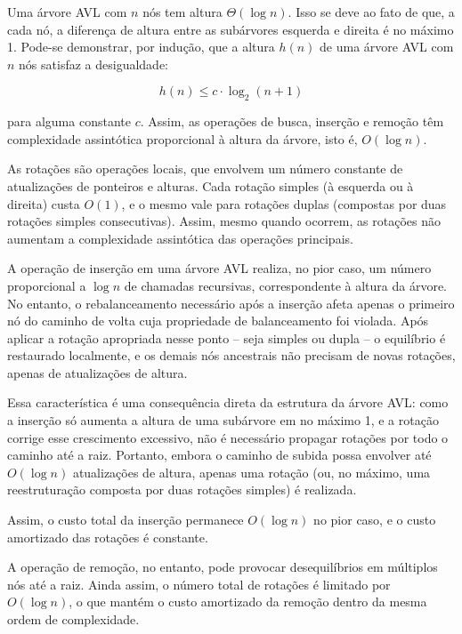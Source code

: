 Uma árvore AVL com $n$ nós tem altura $\Theta(\log n)$. 
Isso se deve ao fato de que, a cada nó, a diferença de altura entre as subárvores esquerda e direita é no máximo 1. 
Pode-se demonstrar, por indução, que a altura $h(n)$ de uma árvore AVL com $n$ nós satisfaz a desigualdade:

\[
h(n) \leq c \cdot \log_2(n + 1)
\]

para alguma constante $c$. 
Assim, as operações de busca, inserção e remoção têm complexidade assintótica proporcional à altura da árvore, isto é, $O(\log n)$.

As rotações são operações locais, que envolvem um número constante de atualizações de ponteiros e alturas. 
Cada rotação simples (à esquerda ou à direita) custa $O(1)$, e o mesmo vale para rotações duplas (compostas por duas rotações simples consecutivas). 
Assim, mesmo quando ocorrem, as rotações não aumentam a complexidade assintótica das operações principais.

A operação de inserção em uma árvore AVL realiza, no pior caso, um número proporcional a $\log n$ de chamadas recursivas, correspondente à altura da árvore. 
No entanto, o rebalanceamento necessário após a inserção afeta apenas o primeiro nó do caminho de volta cuja propriedade de balanceamento foi violada. 
Após aplicar a rotação apropriada nesse ponto -- seja simples ou dupla -- o equilíbrio é restaurado localmente, e os demais nós ancestrais não precisam de novas rotações, apenas de atualizações de altura.

Essa característica é uma consequência direta da estrutura da árvore AVL: como a inserção só aumenta a altura de uma subárvore em no máximo 1, e a rotação corrige esse crescimento excessivo, não é necessário propagar rotações por todo o caminho até a raiz. 
Portanto, embora o caminho de subida possa envolver até $O(\log n)$ atualizações de altura, apenas uma rotação (ou, no máximo, uma reestruturação composta por duas rotações simples) é realizada.

Assim, o custo total da inserção permanece $O(\log n)$ no pior caso, e o custo amortizado das rotações é constante.

A operação de remoção, no entanto, pode provocar desequilíbrios em múltiplos nós até a raiz. 
Ainda assim, o número total de rotações é limitado por $O(\log n)$, o que mantém o custo amortizado da remoção dentro da mesma ordem de complexidade.
